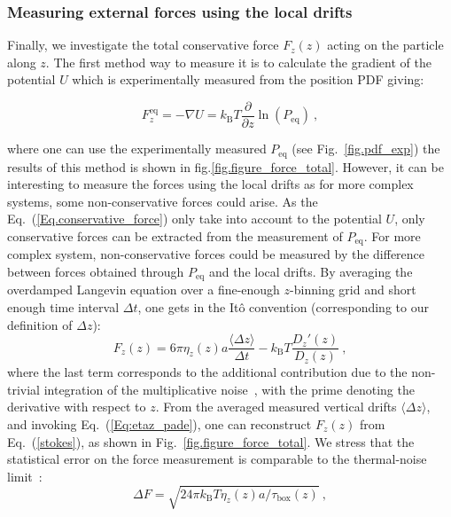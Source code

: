 \subsubsection{Measuring external forces using the local drifts}
Finally, we investigate the total conservative force $F_z(z)$ acting on the particle along $z$. The first method way to measure it is to calculate the gradient of the potential $U$ which is experimentally measured from the position \gls{PDF} giving:


\begin{equation}
	F_z^\mathrm{eq} = -\nabla U = k_\mathrm{B}T \frac{\partial}{\partial z} \ln (P_\mathrm{eq}) ~,
	\label{Eq.conservative_force}
\end{equation}

where one can use the experimentally measured $P_\mathrm{eq}$ (see Fig.~\ref{fig.pdf_exp}) the results of this method is shown in fig.\ref{fig.figure_force_total}. However, it can be interesting to measure the forces using the local drifts as for more complex systems, some non-conservative forces could arise. As the Eq.~(\ref{Eq.conservative_force}) only take into account to the potential $U$, only conservative forces can be extracted from the measurement of $P_\mathrm{eq}$. For more complex system, non-conservative forces could be measured by the difference between forces obtained through $P_\mathrm{eq}$ and the local drifts.  By averaging the overdamped Langevin equation over a fine-enough $z$-binning grid and short enough time interval $\Delta t$, one gets in the Itô convention (corresponding to our definition of $\Delta z$):
\begin{equation}
	F_z (z) = 6 \pi \eta_z (z ) a \frac{\langle\Delta z\rangle}{\Delta t} - k_\mathrm{B}T \frac{D_z'(z)}{D_z(z)} \ ,
	\label{stokes}
\end{equation}
where the last term corresponds to the additional contribution due to the non-trivial integration of the multiplicative noise~\cite{volpe_influence_2010,mannella_comment_2011,mannella_ito_2012, sancho_brownian_2011}, with the prime denoting the derivative with respect to $z$. From the averaged measured vertical drifts $\langle\Delta z\rangle$, and invoking Eq.~(\ref{Eq:etaz_pade}), one can reconstruct $F_z(z)$ from Eq.~(\ref{stokes}), as shown in Fig.~\ref{fig.figure_force_total}. We stress that the statistical error on the force measurement is comparable to the thermal-noise limit~\cite{liu_subfemtonewton_2016}: 
\begin{equation}
	\label{tnl}
	\Delta F=\sqrt{24\pi k_{\mathrm{B}}T \eta_z(z) a/ \tau_{\textrm{box}}(z)}\ ,
\end{equation}
